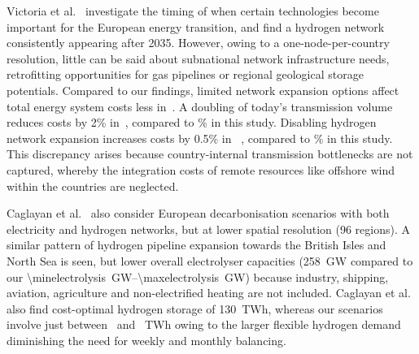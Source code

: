 Victoria et al.~\cite{victoriaSpeedTechnological2022} investigate the timing of
when certain technologies %
become important for the European energy transition, and find a hydrogen
network consistently appearing after 2035. However, owing to a
one-node-per-country resolution, little can be said about subnational network
infrastructure needs, retrofitting opportunities for gas pipelines or regional
geological storage potentials. Compared to our findings, limited network
expansion options affect total energy system costs less
in~\cite{victoriaSpeedTechnological2022}. A doubling of today's transmission
volume reduces costs by 2\% in~\cite{victoriaSpeedTechnological2022}, compared to
\maxacbenefitrel\% in this study. Disabling hydrogen network expansion increases
costs by 0.5\% in ~\cite{victoriaSpeedTechnological2022}, compared to
\maxhybenefitrel\% in this study. This discrepancy arises because
country-internal transmission bottlenecks are not captured, whereby the
integration costs of remote resources like offshore wind within the countries
are neglected.

Caglayan et al.~\cite{Caglayan2019} also consider European decarbonisation
scenarios with both electricity and hydrogen networks, but at lower spatial
resolution (96 regions). A similar pattern of hydrogen pipeline expansion
towards the British Isles and North Sea is seen, but lower overall electrolyser
capacities (258~GW compared to our
\SIrange{\minelectrolysis}{\maxelectrolysis}{\giga\watt}) because industry,
shipping, aviation, agriculture and non-electrified heating are not included.
Caglayan et al.~\cite{Caglayan2019} also find cost-optimal hydrogen
storage of 130~TWh, whereas our scenarios involve just between
\hydrogenstorageacnhyn~and \hydrogenstorageacnhyy~TWh owing to the larger
flexible hydrogen demand diminishing the need for weekly and monthly balancing.

